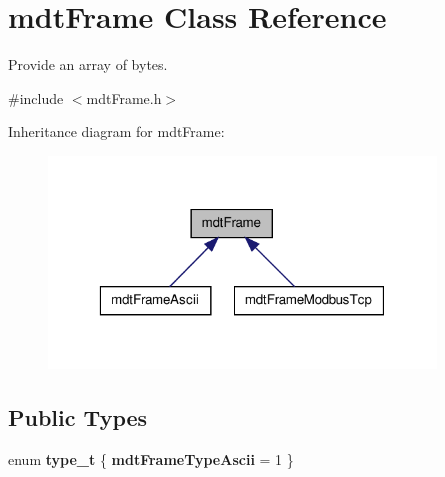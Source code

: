 \hypertarget{classmdt_frame}{
\section{mdtFrame Class Reference}
\label{classmdt_frame}
}


Provide an array of bytes.  




{\ttfamily \#include $<$mdtFrame.h$>$}



Inheritance diagram for mdtFrame:
\nopagebreak
\begin{figure}[H]
\begin{center}
\leavevmode
\includegraphics[width=292pt]{classmdt_frame__inherit__graph}
\end{center}
\end{figure}
\subsection*{Public Types}
\begin{DoxyCompactItemize}
\item 
enum {\bfseries type\_\-t} \{ {\bfseries mdtFrameTypeAscii} =  1
 \}
\end{DoxyCompactItemize}
